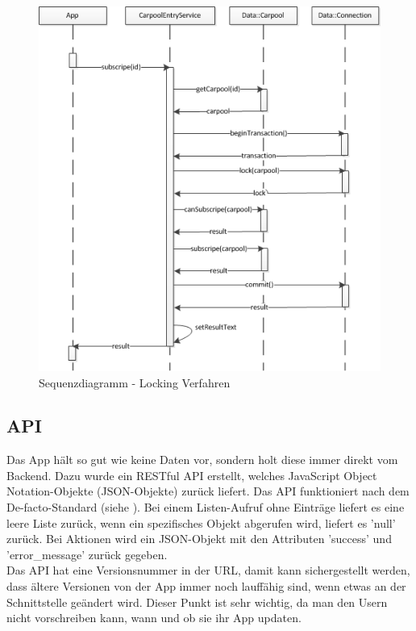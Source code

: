\begin{figure}[h]
\centering
\includegraphics[scale=0.5]{images/visio/locking_verfahren.png}
\caption{Sequenzdiagramm - Locking Verfahren}
\label{fig:locking_verfahren}
\end{figure}

\FloatBarrier
\subsection{API}
Das App hält so gut wie keine Daten vor, sondern holt diese immer direkt vom Backend. Dazu wurde ein RESTful API erstellt, welches JavaScript Object Notation-Objekte (JSON-Objekte) zurück liefert. Das API funktioniert nach dem De-facto-Standard (siehe \cite{wiki_restful}). Bei einem Listen-Aufruf ohne Einträge liefert es eine leere Liste zurück, wenn ein spezifisches Objekt abgerufen wird, liefert es 'null' zurück. Bei Aktionen wird ein JSON-Objekt mit den Attributen 'success' und 'error\_message' zurück gegeben.\\

Das API hat eine Versionsnummer in der URL, damit kann sichergestellt werden, dass ältere Versionen von der App immer noch lauffähig sind, wenn etwas an der Schnittstelle geändert wird. Dieser Punkt ist sehr wichtig, da man den Usern nicht vorschreiben kann, wann und ob sie ihr App updaten.

